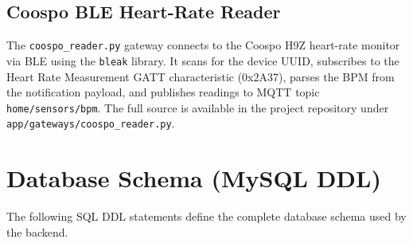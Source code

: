 \section{Coospo BLE Heart-Rate Reader}

The \texttt{coospo\_reader.py} gateway connects to the Coospo H9Z heart-rate
monitor via BLE using the \texttt{bleak} library. It scans for the device UUID,
subscribes to the Heart Rate Measurement GATT characteristic (0x2A37), parses
the BPM from the notification payload, and publishes readings to MQTT topic
\texttt{home/sensors/bpm}. The full source is available in the project repository
under \texttt{app/gateways/coospo\_reader.py}.

\chapter{Database Schema (MySQL DDL)}

The following SQL DDL statements define the complete database schema used by the backend.

